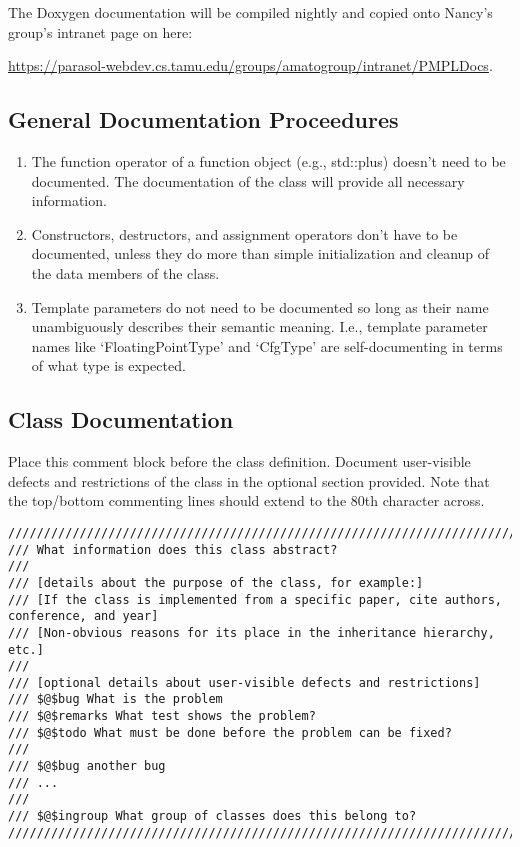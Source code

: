 \documentclass[12pt]{article}
\begin{document}
The Doxygen documentation will be compiled nightly and copied onto
Nancy's group's intranet page on here:

\url{https://parasol-webdev.cs.tamu.edu/groups/amatogroup/intranet/PMPLDocs}.

\subsection{General Documentation Proceedures}

\begin{enumerate}
  \item The function operator of a function object (e.g., std::plus) doesn’t
    need to be documented. The documentation of the class will provide all
    necessary information.
  \item Constructors, destructors, and assignment operators don’t have to be
    documented, unless they do more than simple initialization and cleanup of
    the data members of the class.
  \item Template parameters do not need to be documented so long as their name
    unambiguously describes their semantic meaning. I.e., template parameter
    names like `FloatingPointType' and `CfgType' are self-documenting in terms
    of what type is expected.
\end{enumerate}

\subsection{Class Documentation}

Place this comment block before the class definition. Document user-visible
defects and restrictions of the class in the optional section provided. Note
that the top/bottom commenting lines should extend to the 80th character across.

\begin{lstlisting}[mathescape]
///////////////////////////////////////////////////////////////////////////////
/// What information does this class abstract?
///
/// [details about the purpose of the class, for example:]
/// [If the class is implemented from a specific paper, cite authors, conference, and year]
/// [Non-obvious reasons for its place in the inheritance hierarchy, etc.]
///
/// [optional details about user-visible defects and restrictions]
/// $@$bug What is the problem
/// $@$remarks What test shows the problem?
/// $@$todo What must be done before the problem can be fixed?
///
/// $@$bug another bug
/// ...
///
/// $@$ingroup What group of classes does this belong to?
///////////////////////////////////////////////////////////////////////////////
\end{lstlisting}
\end{document}
